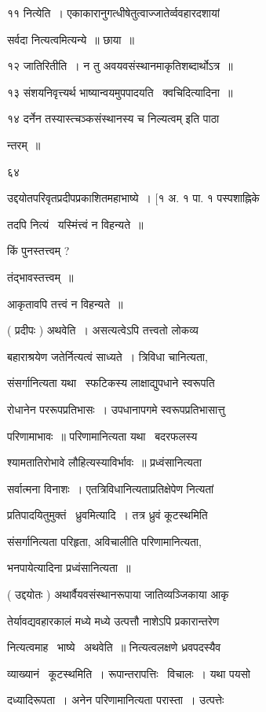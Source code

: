 \documentclass[11pt, openany]{book}
\begin{document}
११ नित्येति~। एकाकारानुगत्धीषेतुत्वाज्जातेर्व्ववहारदशायां 

सर्वदा नित्यत्वमित्यन्ये~॥ छाया~॥ 

१२ जातिरितीति~। न तु अवयवसंस्थानमाकृतिशब्दार्थोऽत्र~॥ 

१३ संशयनिवृत्त्यर्थ भाष्यान्वयमुपपादयति \textendash\ क्वचिदित्यादिना~॥ 

१४ दर्नेन तस्यास्त्चञ्कसंस्थानस्य च निल्यत्वम् इति पाठा \textendash\ 

न्तरम्~॥ 

६४ 

उद्दयोतपरिवृतप्रदीपप्रकाशितमहाभाष्ये~। [१ अ. १ पा. १ पस्पशाह्निके 



तदपि नित्यं \textendash\ यस्मिंत्त्वं न विहन्यते~॥ 

किं पुनस्तत्त्वम् ? 

तंद्भावस्तत्त्वम्~॥ 

आकृतावपि तत्त्वं न विहन्यते~॥ 

( प्रदीपः ) अथवेति~। असत्यत्वेऽपि तत्त्वतो लोकव्य \textendash\ 

बहाराश्रयेण जतेर्नित्यत्वं साध्यते~। त्रिविधा चानित्यता, 

संसर्गानित्यता यथा \textendash\ स्फटिकस्य लाक्षाद्युपधाने स्वरूपति \textendash\ 

रोधानेन पररूपप्रतिभासः~। उपधानापगमे स्वरूपप्रतिभासात्तु 

परिणामाभावः~॥ परिणामानित्यता यथा \textendash\ बदरफलस्य 

श्यामतातिरोभावे लौहित्यस्याविर्भावः~॥ प्रध्वंसानित्यता \textendash\ 

सर्वात्मना विनाशः~। एतत्रिविधानित्यताप्रतिक्षेपेण नित्यतां 

प्रतिपादयितुमुक्तं \textendash\ ध्रुवमित्यादि~। तत्र ध्रुवं कूटस्थमिति 

संसर्गानित्यता परिहृता, अविचालीति परिणामानित्यता, 

भनपायेत्यादिना प्रध्वंसानित्यता~॥ 

( उद्दयोतः ) अथार्वैयवसंस्थानरूपाया जातिव्यञ्जिकाया आकृ \textendash\ 

तेर्यावद्यवहारकालं मध्ये मध्ये उत्पत्तौ नाशेऽपि प्रकारान्तरेण 

नित्यत्वमाह \textendash\ भाष्ये \textendash\ अथवेति~॥ नित्यत्वलक्षणे ध्रवपदस्यैव 

व्याख्यानं \textendash\ कूटस्थमिति~। रूपान्तरापत्तिः \textendash\ विचालः~। यथा पयसो 

दध्यादिरूपता~। अनेन परिणामानित्यता परास्ता~। उत्पत्तेः 
\end{document}

